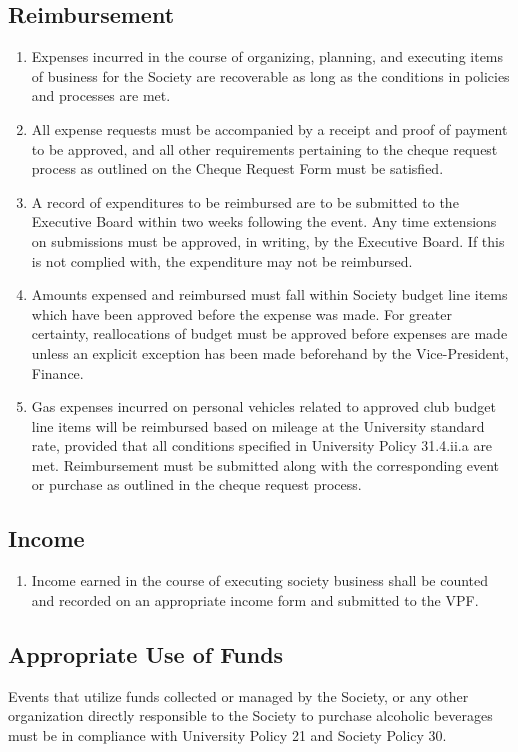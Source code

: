 \subsection{Reimbursement}
\begin{enumerate}
\item Expenses incurred in the course of organizing, planning, and executing items of business for the Society are recoverable as long as the conditions in policies and processes are met.
\item All expense requests must be accompanied by a receipt and proof of payment to be approved, and all other requirements pertaining to the cheque request process as outlined on the Cheque Request Form must be satisfied.
\item A record of expenditures to be reimbursed are to be submitted to the Executive Board within two weeks following the event. Any time extensions on submissions must be approved, in writing, by the Executive Board. If this is not complied with, the expenditure may not be reimbursed.
\item Amounts expensed and reimbursed must fall within Society budget line items which have been approved before the expense was made. For greater certainty, reallocations of budget must be approved before expenses are made unless an explicit exception has been made beforehand by the Vice-President, Finance.
\item Gas expenses incurred on personal vehicles related to approved club budget line items will be reimbursed based on mileage at the University standard rate, provided that all conditions specified in University Policy 31.4.ii.a are met. Reimbursement must be submitted along with the corresponding event or purchase as outlined in the cheque request process.
\end{enumerate}

\subsection{Income}
\begin{enumerate}
\item Income earned in the course of executing society business shall be counted and recorded on an appropriate income form and submitted to the VPF.
\end{enumerate}

\subsection{Appropriate Use of Funds}
Events that utilize funds collected or managed by the Society, or any other organization directly responsible to the Society to purchase alcoholic beverages must be in compliance with University Policy 21 and Society Policy 30.

